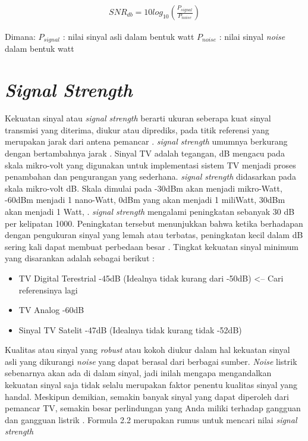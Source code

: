 \begin{equation}
	\begin{aligned}
		SNR_{db}=10log_{10}(\frac{P_{signal}}{P_{noise}})
	\end{aligned}
\end{equation}

Dimana:
\newline
$P_{signal}$ 		\hspace{0.5cm}: nilai sinyal asli dalam bentuk watt \newline
$P_{noise}$ 	\hspace{0.6cm}: nilai sinyal \textit{noise} dalam bentuk watt \newline

\section{\textit{Signal Strength}}
\hspace{1,2cm}Kekuatan sinyal atau \textit{signal strength} berarti ukuran seberapa kuat sinyal transmisi yang diterima, diukur atau diprediks, pada titik referensi yang merupakan jarak  dari antena pemancar \citep{Hendrickson2022}. \textit{signal strength} umumnya berkurang dengan bertambahnya jarak \citep{Matthews2018}. Sinyal TV adalah tegangan, dB mengacu pada skala mikro-volt yang digunakan untuk implementasi sistem TV menjadi proses penambahan dan pengurangan yang sederhana. \textit{signal strength} didasarkan pada skala mikro-volt dB. Skala dimulai pada -30dBm akan menjadi mikro-Watt, -60dBm menjadi 1 nano-Watt, 0dBm yang akan menjadi 1 miliWatt, 30dBm akan menjadi 1 Watt, . \textit{signal strength} mengalami peningkatan sebanyak 30 dB per kelipatan 1000. Peningkatan tersebut menunjukkan bahwa ketika berhadapan dengan pengukuran sinyal yang lemah atau terbatas, peningkatan kecil dalam dB sering kali dapat membuat perbedaan besar \citep{Frost2014}. Tingkat kekuatan sinyal minimum yang disarankan adalah sebagai berikut \citep{Hendrickson2022}:

\begin{itemize}
	\item TV Digital Terestrial -45dB (Idealnya tidak kurang dari -50dB) <-- Cari referensinya lagi
	\item TV Analog -60dB
	\item Sinyal TV Satelit -47dB (Idealnya tidak kurang tidak -52dB)
\end{itemize}

Kualitas atau sinyal yang \textit{robust} atau kokoh diukur dalam hal kekuatan sinyal asli yang dikurangi \textit{noise} yang dapat berasal dari berbagai sumber. \textit{Noise} listrik sebenarnya akan ada di dalam sinyal, jadi inilah mengapa mengandalkan kekuatan sinyal saja tidak selalu merupakan faktor penentu kualitas sinyal yang handal. Meskipun demikian, semakin banyak sinyal yang dapat diperoleh dari pemancar TV, semakin besar perlindungan yang Anda miliki terhadap gangguan dan gangguan listrik \citep{Matthews2018}. Formula 2.2 merupakan rumus untuk mencari nilai \textit{signal strength}

